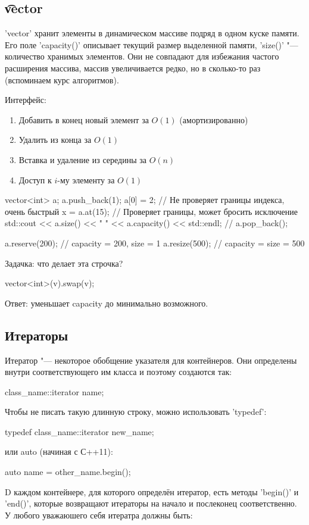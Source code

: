 \subsection{\t{vector}}
 
\cpp'vector' хранит элементы в динамическом массиве подряд в одном куске памяти.
Его поле \cpp'capacity()' описывает текущий размер выделенной памяти, \cpp'size()' "--- количество хранимых элементов.
Они не совпадают для избежания частого расширения массива, массив увеличивается редко, но в сколько-то раз (вспоминаем курс алгоритмов).
 
Интерфейс:
\begin{enumerate}
	\item Добавить в конец новый элемент за $O(1)$ (амортизированно)
	\item Удалить из конца за $O(1)$
	\item Вставка и удаление из середины за $O(n)$
	\item Доступ к $i$-му элементу за $O(1)$
\end{enumerate}
 
\begin{cppcode}
vector<int> a;
a.push_back(1);
a[0] = 2; // Не проверяет границы индекса, очень быстрый
x = a.at(15); // Проверяет границы, может бросить исключение
std::cout << a.size() << " " << a.capacity() << std::endl;
// a.pop_back();
 
a.reserve(200); // capacity = 200, size = 1
a.resize(500); // capacity = size = 500
\end{cppcode}

Задачка: что делает эта строчка? 
\begin{cppcode}
vector<int>(v).swap(v);
\end{cppcode}
Ответ: уменьшает capacity до минимально возможного.

\subsection{Итераторы}

Итератор "--- некоторое обобщение указателя для контейнеров.
Они определены внутри соответствующего им класса и поэтому создаются так:
\begin{cppcode}
class_name::iterator name;
\end{cppcode}
Чтобы не писать такую длинную строку, можно использовать \cpp'typedef':
\begin{cppcode}
typedef class_name::iterator new_name;
\end{cppcode}
или auto (начиная с С++11):
\begin{cppcode}
auto name = other_name.begin();
\end{cppcode}
D каждом контейнере, для которого определён итератор, есть методы \cpp'begin()' и \cpp'end()', которые возвращают итераторы на начало и послеконец соответственно. У любого уважаюшего себя итератра должны быть:

